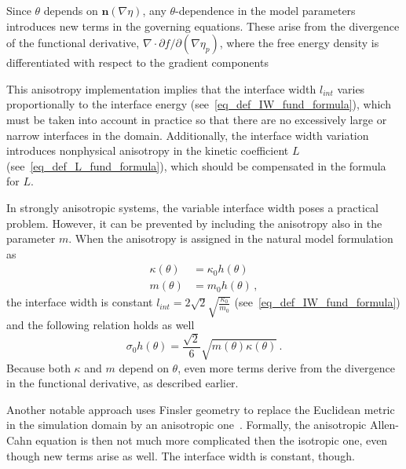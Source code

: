 	Since $\theta$ depends on $\bm{n}(\nabla\eta)$, any $\theta$-dependence in the model parameters introduces new terms in the governing equations. These arise from the divergence of the functional derivative, $\nabla\cdot\partial f/\partial(\nabla \eta_p)$, where the free energy density is differentiated with respect to the gradient components
	
	
	This anisotropy implementation implies that the interface width $l_{int}$ varies proportionally to the interface energy (see~\eqref{eq_def_IW_fund_formula}), which must be taken into account in practice so that there are no excessively large or narrow interfaces in the domain. Additionally, the interface width variation introduces nonphysical anisotropy in the kinetic coefficient $L$ (see~\eqref{eq_def_L_fund_formula}), which should be compensated in the formula for $L$.
	
	In strongly anisotropic systems, the variable interface width poses a practical problem. However, it can be prevented by including the anisotropy also in the parameter $m$. When the anisotropy is assigned in the natural model formulation as
	\begin{align}
		\kappa(\theta) 	&= \kappa_0 h(\theta) \\
		m(\theta) 		&= m_0 h(\theta) \,,
	\end{align}
	the interface width is constant $l_{int}=2\sqrt{2}\sqrt{\frac{\kappa_0}{m_0}} $ (see~\eqref{eq_def_IW_fund_formula}) and the following relation holds as well
	\begin{equation}
		\sigma_0 h(\theta) = \frac{\sqrt{2}}{6}\sqrt{m(\theta)\kappa(\theta)} \,.
	\end{equation}
	Because both $\kappa$ and $m$ depend on $\theta$, even more terms derive from the divergence in the functional derivative, as described earlier. 

	Another notable approach uses Finsler geometry to replace the Euclidean metric in the simulation domain by an anisotropic one~\cite{Bellettini1996,Benes2003}. Formally, the anisotropic Allen-Cahn equation is then not much more complicated then the isotropic one, even though new terms arise as well. The interface width is constant, though.
	
